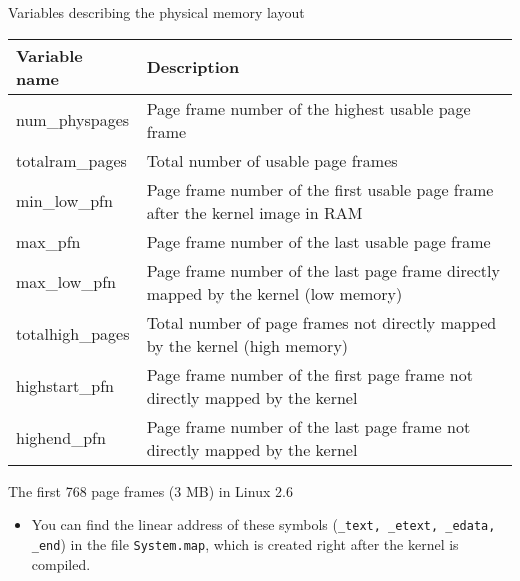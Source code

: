 \begin{frame}
  \begin{block}{Variables describing the physical memory layout}
    \begin{scriptsize}
      \begin{center}{\ttfamily
        \begin{tabular}{lp{}}\hline
          \textbf{Variable name}&\textbf{Description}\\\hline
          num\_physpages&Page frame number of the highest usable page frame\\\hline
          totalram\_pages&Total number of usable page frames\\\hline
          min\_low\_pfn&Page frame number of the first usable page frame after the kernel image in RAM\\\hline
          max\_pfn&Page frame number of the last usable page frame\\\hline
          max\_low\_pfn&Page frame number of the last page frame directly mapped by the kernel (low memory)\\\hline
          totalhigh\_pages&Total number of page frames not directly mapped by the kernel (high memory)\\\hline
          highstart\_pfn&Page frame number of the first page frame not directly mapped by the kernel\\\hline
          highend\_pfn&Page frame number of the last page frame not directly mapped by the kernel\\\hline
        \end{tabular}}
      \end{center}
    \end{scriptsize}
  \end{block}
\end{frame}

\begin{frame}%
  \begin{block}{The first 768 page frames (3 MB) in Linux 2.6}
    \begin{center}
    \end{center}
  \end{block}
\end{frame}

\begin{itemize}
\item You can find the linear address of these symbols (\texttt{\_text, \_etext, \_edata,
    \_end}) in the file \texttt{System.map}, which is created right after the kernel is
  compiled.
\end{itemize}

